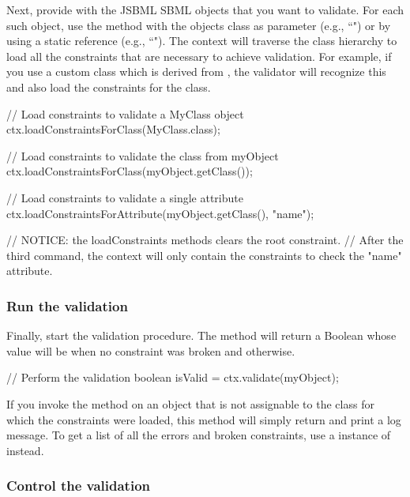 Next, provide  with the JSBML SBML objects that you
want to validate. For each such object, use the method
 with the objects class as
parameter (e.g., ``") or by using a static reference
(e.g., ``"). The context will traverse the class
hierarchy to load all the constraints that are necessary to achieve
validation. For example, if you use a custom class which is derived from
\Species, the validator will recognize this and also load the constraints for
the \Species class.

\vspace*{1ex}
\begin{example}[style=java, title={Three different ways to load constraints.}]
// Load constraints to validate a MyClass object
ctx.loadConstraintsForClass(MyClass.class);	

// Load constraints to validate the class from myObject
ctx.loadConstraintsForClass(myObject.getClass());

// Load constraints to validate a single attribute
ctx.loadConstraintsForAttribute(myObject.getClass(), "name");

// NOTICE: the loadConstraints methods clears the root constraint.
// After the third command, the context will only contain the constraints to check the "name" attribute.
\end{example}


\subsubsection{Run the validation}

Finally, start the validation procedure. The method 
will return a Boolean whose value will be  when no constraint was
broken and  otherwise.

\begin{example}[style=java, title={Validate.}]
// Perform the validation
boolean isValid = ctx.validate(myObject);
\end{example}

If you invoke the  method on an object that is not assignable
to the class for which the constraints were loaded, this method will simply
return  and print a log message.  To get a list of all the errors
and broken constraints, use a instance of 
instead.


\subsubsection{Control the validation}

